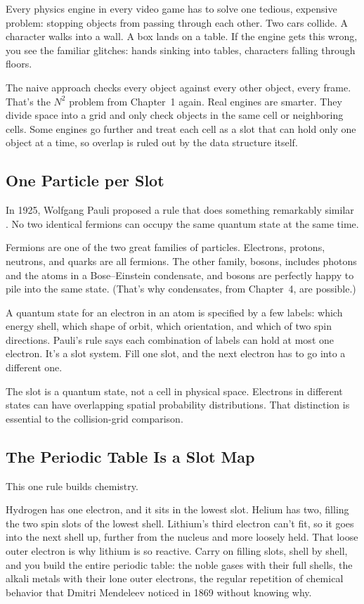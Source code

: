 Every physics engine in every video game has to solve one tedious, expensive problem: stopping objects from passing through each other. Two cars collide. A character walks into a wall. A box lands on a table. If the engine gets this wrong, you see the familiar glitches: hands sinking into tables, characters falling through floors.

The naive approach checks every object against every other object, every frame. That's the \(N^2\) problem from Chapter~1 again. Real engines are smarter. They divide space into a grid and only check objects in the same cell or neighboring cells. Some engines go further and treat each cell as a slot that can hold only one object at a time, so overlap is ruled out by the data structure itself.

\subsection{One Particle per Slot}

In 1925, Wolfgang Pauli proposed a rule that does something remarkably similar \cite{pauli1925}. No two identical fermions can occupy the same quantum state at the same time.

Fermions are one of the two great families of particles. Electrons, protons, neutrons, and quarks are all fermions. The other family, bosons, includes photons and the atoms in a Bose--Einstein condensate, and bosons are perfectly happy to pile into the same state. (That's why condensates, from Chapter~4, are possible.)

A quantum state for an electron in an atom is specified by a few labels: which energy shell, which shape of orbit, which orientation, and which of two spin directions. Pauli's rule says each combination of labels can hold at most one electron. It's a slot system. Fill one slot, and the next electron has to go into a different one.

The slot is a quantum state, not a cell in physical space. Electrons in different states can have overlapping spatial probability distributions. That distinction is essential to the collision-grid comparison.

\subsection{The Periodic Table Is a Slot Map}

This one rule builds chemistry.

Hydrogen has one electron, and it sits in the lowest slot. Helium has two, filling the two spin slots of the lowest shell. Lithium's third electron can't fit, so it goes into the next shell up, further from the nucleus and more loosely held. That loose outer electron is why lithium is so reactive. Carry on filling slots, shell by shell, and you build the entire periodic table: the noble gases with their full shells, the alkali metals with their lone outer electrons, the regular repetition of chemical behavior that Dmitri Mendeleev noticed in 1869 without knowing why.


